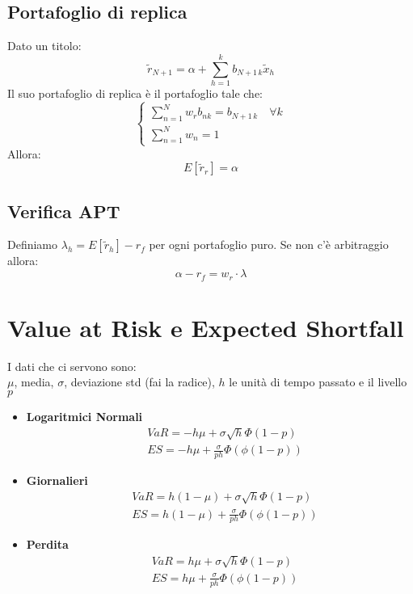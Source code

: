 \documentclass[a4paper,notitlepage]{report}%
\begin{document}
\begin{multicols*}{2}
    \subsection*{Portafoglio di replica}
    Dato un titolo:
    \[
        \tilde{r}_{N+1} = \alpha + \sum_{h=1}^k b_{N+1 \, k}\tilde{x}_h
    \]
    Il suo portafoglio di replica è il portafoglio tale che:
    \[
        \left\{\begin{array}{l}
            \sum_{n=1}^N w_r b_{nk} = b_{N+1 \, k} \quad \forall k\\
            \sum_{n=1}^N w_n  = 1
        \end{array}\right.  
    \]
    Allora:
    \[
        E[\tilde{r}_r] = \alpha    
    \]

    \subsection*{Verifica APT}
    Definiamo $\lambda_h = E[\tilde{r}_h]-r_f$ per ogni portafoglio puro.
    Se non c'è arbitraggio allora:
    \[
        \alpha-r_f = w_r \cdot \lambda    
    \]




\section*{Value at Risk e Expected Shortfall}
    I dati che ci servono sono: \\
    $\mu$, media, $\sigma$, deviazione std (fai la radice),
    $h$ le unità di tempo passato e il livello $p$
    \begin{itemize}
        \item \textbf{Logaritmici Normali} 
            \begin{align*}
                &VaR = -h\mu+\sigma\sqrt{h}\Phi(1-p) \\
                &ES = -h\mu+\frac{\sigma}{ph} \Phi(\phi(1-p))
            \end{align*}
        \item \textbf{Giornalieri}
            \begin{align*}
                &VaR = h(1-\mu)+\sigma\sqrt{h}\Phi(1-p) \\
                &ES = h(1-\mu)+\frac{\sigma}{ph} \Phi(\phi(1-p))
            \end{align*}
        \item \textbf{Perdita}
            \begin{align*}
                &VaR = h\mu+\sigma\sqrt{h}\Phi(1-p) \\
                &ES = h\mu+\frac{\sigma}{ph} \Phi(\phi(1-p))
            \end{align*}
    \end{itemize}


\end{multicols*}
\end{document}
